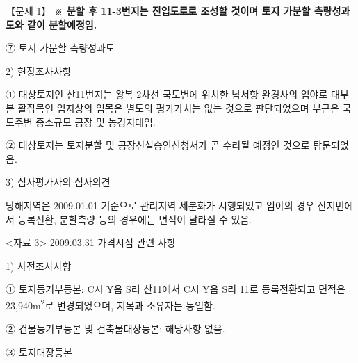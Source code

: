 \begin{longquestion}{【문제 1】}
\textbf{※ 분할 후 11-3번지는 진입도로로 조성할 것이며 토지 가분할 측량성과도와 같이 분할예정임.} \par
⑦ 토지 가분할 측량성과도 \par
{}
2) 현장조사사항 \par
① 대상토지인 산11번지는 왕복 2차선 국도변에 위치한 남서향 완경사의 임야로 대부분 활잡목인 임지상의 임목은 별도의 평가가치는 없는 것으로 판단되었으며 부근은 국도주변 중소규모 공장 및 농경지대임. \par
② 대상토지는 토지분할 및 공장신설승인신청서가 곧 수리될 예정인 것으로 탐문되었음. \par
3) 심사평가사의 심사의견 \par
당해지역은 2009.01.01 기준으로 관리지역 세분화가 시행되었고 임야의 경우 산지번에서 등록전환, 분할측량 등의 경우에는 면적이 달라질 수 있음. \par
<자료 3> 2009.03.31 가격시점 관련 사항 \par
1) 사전조사사항 \par
① 토지등기부등본: C시 Y읍 S리 산11에서 C시 Y읍 S리 11로 등록전환되고 면적은 23,940m\textsuperscript{2}로 변경되었으며, 지목과 소유자는 동일함. \par
② 건물등기부등본 및 건축물대장등본: 해당사항 없음. \par
③ 토지대장등본 \par
{\small\centering
{}\par}


\end{longquestion}
